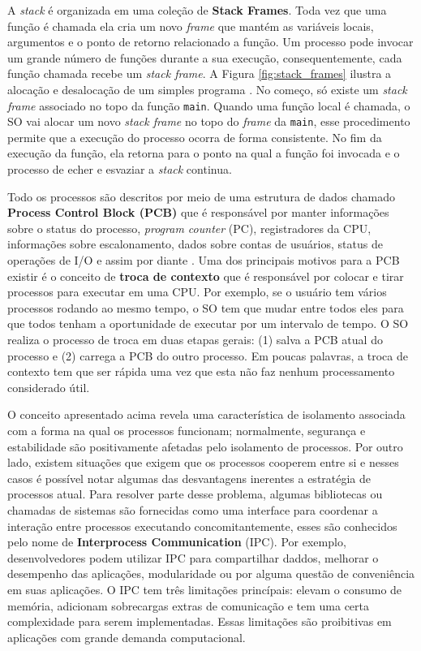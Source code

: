 A \emph{stack} é organizada em uma coleção de \textbf{Stack Frames}. Toda vez
que uma função é chamada ela cria um novo \emph{frame} que mantém as variáveis
locais, argumentos e o ponto de retorno relacionado a função. Um processo pode
invocar um grande número de funções durante a sua execução, consequentemente,
cada função chamada recebe um \emph{stack frame}. A Figura
\ref{fig:stack_frames} ilustra a alocação e desalocação de um simples programa
\cite{gdb}. No começo, só existe um \emph{stack frame} associado no topo da
função \texttt{main}. Quando uma função local é chamada, o SO vai alocar um
novo \emph{stack frame} no topo do \emph{frame} da \texttt{main}, esse
procedimento permite que a execução do processo ocorra de forma consistente. No
fim da execução da função, ela retorna para o ponto na qual a função foi
invocada e o processo de echer e esvaziar a \emph{stack} continua.

Todo os processos são descritos por meio de uma estrutura de dados chamado
\textbf{Process Control Block (PCB)} que é responsável por manter informações
sobre o status do processo, \emph{program counter} (PC), registradores da CPU,
informações sobre escalonamento, dados sobre contas de usuários, status de
operações de I/O e assim por diante \cite{silberschatz}. Uma dos principais
motivos para a PCB existir é o conceito de \textbf{troca de contexto} que é
responsável por colocar e tirar processos para executar em uma CPU. Por
exemplo, se o usuário tem vários processos rodando ao mesmo tempo, o SO tem que
mudar entre todos eles para que todos tenham a oportunidade de executar por um
intervalo de tempo. O SO realiza o processo de troca em duas etapas gerais: (1)
salva a PCB atual do processo e (2) carrega a PCB do outro processo. Em
poucas palavras, a troca de contexto tem que ser rápida uma vez que esta não
faz nenhum processamento considerado útil.


O conceito apresentado acima revela uma característica de isolamento associada
com a forma na qual os processos funcionam; normalmente, segurança e
estabilidade são positivamente afetadas pelo isolamento de processos. Por outro
lado, existem situações que exigem que os processos cooperem entre si e nesses
casos é possível notar algumas das desvantagens inerentes a estratégia de
processos atual. Para resolver parte desse problema, algumas bibliotecas ou
chamadas de sistemas são fornecidas como uma interface para coordenar a
interação entre processos executando concomitantemente, esses são conhecidos
pelo nome de \textbf{Interprocess Communication} (IPC). Por exemplo,
desenvolvedores podem utilizar IPC para compartilhar daddos, melhorar o
desempenho das aplicações, modularidade ou por alguma questão de conveniência
em suas aplicações. O IPC tem três limitações princípais: elevam o consumo de
memória, adicionam sobrecargas extras de comunicação e tem uma certa
complexidade para serem implementadas. Essas limitações são proibitivas em
aplicações com grande demanda computacional.

